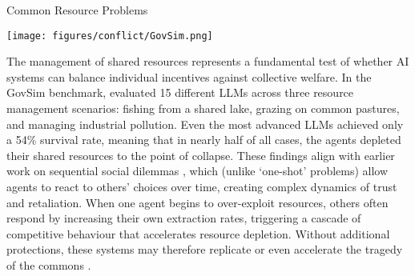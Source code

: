 \begin{case-study}[label=cs:common_resource_problems]{Common Resource Problems}
  \begin{center}
    \texttt{[image: figures/conflict/GovSim.png]}
  \end{center}
  \vspace{1em}
  The management of shared resources represents a fundamental test of whether AI systems can balance individual incentives against collective welfare.\footnotemark{}
  In the GovSim benchmark, \citet{piatti2024cooperatecollapseemergencesustainable} evaluated 15 different LLMs across three resource management scenarios: fishing from a shared lake, grazing on common pastures, and managing industrial pollution.
  Even the most advanced LLMs achieved only a 54\% survival rate, meaning that in nearly half of all cases, the agents depleted their shared resources to the point of collapse.
  These findings align with earlier work on sequential social dilemmas \citep{Leibo2017}, which (unlike `one-shot' problems) allow agents to react to others' choices over time, creating complex dynamics of trust and retaliation.
  When one agent begins to over-exploit resources, others often respond by increasing their own extraction rates, triggering a cascade of competitive behaviour that accelerates resource depletion. Without additional protections, these systems may therefore replicate or even accelerate the tragedy of the commons \citep{Hardin1968}.
\end{case-study}


